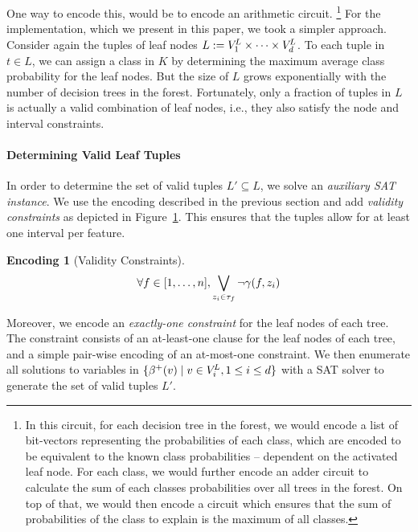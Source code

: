 \documentclass[a4paper, USenglish, cleveref, autoref, thm-restate]{lipics-v2021}
\theoremstyle{definition}
\newtheorem{encoding}{Encoding}[section]
\begin{document}
One way to encode this, would be to encode an arithmetic circuit.%
\footnote{In this circuit, for each decision tree in the forest, we would encode a list of bit-vectors representing the probabilities of each class, which are encoded to be equivalent to the known class probabilities -- dependent on the activated leaf node. 
For each class, we would further encode an adder circuit to calculate the sum of each classes probabilities over all trees in the forest. 
On top of that, we would then encode a circuit which ensures that the sum of probabilities of the class to explain is the maximum of all classes.}
For the implementation, which we present in this paper, we took a simpler approach. 
Consider again the tuples of leaf nodes $L := V^{\!L}_1 \times \dots \times V^{\!L}_d$. 
To each tuple in $t \in L$, we can assign a class in $K$ by determining the maximum average class probability for the leaf nodes. 
But the size of $L$ grows exponentially with the number of decision trees in the forest. 
Fortunately, only a fraction of tuples in $L$ is actually a valid combination of leaf nodes, i.e., they also satisfy the node and interval constraints. 

\paragraph{Determining Valid Leaf Tuples}
\label{sec:valid-tuples}

\newcommand{\validtuples}{\ensuremath{L'}}%
\newcommand{\tuplev}[1]{\ensuremath{\delta(#1)}}%
In order to determine the set of valid tuples $\validtuples \subseteq L$, we solve an \emph{auxiliary SAT instance}. 
We use the encoding described in the previous section and add \emph{validity constraints} as depicted in Figure~\ref{enc:validity}. 
This ensures that the tuples allow for at least one interval per feature. 
%
\begin{encoding}[Validity Constraints]
\label{enc:validity}
\begin{align*}
\forall f \in [1, \dots, n], \bigvee\limits_{z_i \in \tau_f} \lnot \gamma(f,z_i)
\end{align*}
\end{encoding}
%
Moreover, we encode an \emph{exactly-one constraint} for the leaf nodes of each tree. 
The constraint consists of an at-least-one clause for the leaf nodes of each tree, and a simple pair-wise encoding of an at-most-one constraint. 
We then enumerate all solutions to variables in $\{ \beta^+(v) \mid v \in V^{\!L}_i, 1 \leq i \leq d \}$ with a SAT solver to generate the set of valid tuples \validtuples. 
\end{document}
